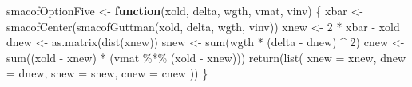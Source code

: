 \documentclass[
  12pt,
  letterpaper,
  DIV=11,
  numbers=noendperiod]{scrartcl}
\newenvironment{Shaded}{\begin{snugshade}}{\end{snugshade}}
\newcommand{\AttributeTok}[1]{\textcolor[rgb]{0.40,0.45,0.13}{#1}}
\newcommand{\ControlFlowTok}[1]{\textcolor[rgb]{0.00,0.23,0.31}{\textbf{#1}}}
\newcommand{\DecValTok}[1]{\textcolor[rgb]{0.68,0.00,0.00}{#1}}
\newcommand{\FunctionTok}[1]{\textcolor[rgb]{0.28,0.35,0.67}{#1}}
\newcommand{\NormalTok}[1]{\textcolor[rgb]{0.00,0.23,0.31}{#1}}
\newcommand{\OtherTok}[1]{\textcolor[rgb]{0.00,0.23,0.31}{#1}}
\newcommand{\SpecialCharTok}[1]{\textcolor[rgb]{0.37,0.37,0.37}{#1}}
\begin{document}
\begin{Shaded}
\begin{Highlighting}[]
\NormalTok{smacofOptionFive }\OtherTok{\textless{}{-}} \ControlFlowTok{function}\NormalTok{(xold, delta, wgth, vmat, vinv) \{}
\NormalTok{  xbar }\OtherTok{\textless{}{-}} \FunctionTok{smacofCenter}\NormalTok{(}\FunctionTok{smacofGuttman}\NormalTok{(xold, delta, wgth, vinv))}
\NormalTok{  xnew }\OtherTok{\textless{}{-}} \DecValTok{2} \SpecialCharTok{*}\NormalTok{ xbar }\SpecialCharTok{{-}}\NormalTok{ xold}
\NormalTok{  dnew }\OtherTok{\textless{}{-}} \FunctionTok{as.matrix}\NormalTok{(}\FunctionTok{dist}\NormalTok{(xnew))}
\NormalTok{  snew }\OtherTok{\textless{}{-}} \FunctionTok{sum}\NormalTok{(wgth }\SpecialCharTok{*}\NormalTok{ (delta }\SpecialCharTok{{-}}\NormalTok{ dnew) }\SpecialCharTok{\^{}} \DecValTok{2}\NormalTok{)}
\NormalTok{  cnew }\OtherTok{\textless{}{-}} \FunctionTok{sum}\NormalTok{((xold }\SpecialCharTok{{-}}\NormalTok{ xnew) }\SpecialCharTok{*}\NormalTok{ (vmat }\SpecialCharTok{\%*\%}\NormalTok{ (xold }\SpecialCharTok{{-}}\NormalTok{ xnew)))}
  \FunctionTok{return}\NormalTok{(}\FunctionTok{list}\NormalTok{(}
    \AttributeTok{xnew =}\NormalTok{ xnew,}
    \AttributeTok{dnew =}\NormalTok{ dnew,}
    \AttributeTok{snew =}\NormalTok{ snew,}
    \AttributeTok{cnew =}\NormalTok{ cnew}
\NormalTok{  ))}
\NormalTok{\}}


\end{Highlighting}
\end{Shaded}
\end{document}
